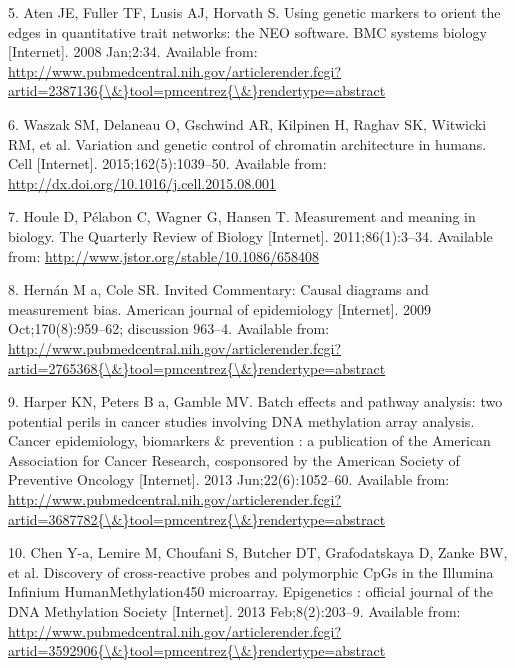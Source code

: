 \documentclass[]{article}
\begin{document}
\hypertarget{ref-Aten2008}{}
5. Aten JE, Fuller TF, Lusis AJ, Horvath S. Using genetic markers to
orient the edges in quantitative trait networks: the NEO software. BMC
systems biology {[}Internet{]}. 2008 Jan;2:34. Available from:
\href{http://www.pubmedcentral.nih.gov/articlerender.fcgi?artid=2387136\%7B/\&\%7Dtool=pmcentrez\%7B/\&\%7Drendertype=abstract}{http://www.pubmedcentral.nih.gov/articlerender.fcgi?artid=2387136\{\textbackslash{}\&\}tool=pmcentrez\{\textbackslash{}\&\}rendertype=abstract}

\hypertarget{ref-Waszak2015}{}
6. Waszak SM, Delaneau O, Gschwind AR, Kilpinen H, Raghav SK, Witwicki
RM, et al. Variation and genetic control of chromatin architecture in
humans. Cell {[}Internet{]}. 2015;162(5):1039--50. Available from:
\url{http://dx.doi.org/10.1016/j.cell.2015.08.001}

\hypertarget{ref-Houle2011}{}
7. Houle D, Pélabon C, Wagner G, Hansen T. Measurement and meaning in
biology. The Quarterly Review of Biology {[}Internet{]}.
2011;86(1):3--34. Available from:
\url{http://www.jstor.org/stable/10.1086/658408}

\hypertarget{ref-Hernan2009}{}
8. Hernán M a, Cole SR. Invited Commentary: Causal diagrams and
measurement bias. American journal of epidemiology {[}Internet{]}. 2009
Oct;170(8):959--62; discussion 963--4. Available from:
\href{http://www.pubmedcentral.nih.gov/articlerender.fcgi?artid=2765368\%7B/\&\%7Dtool=pmcentrez\%7B/\&\%7Drendertype=abstract}{http://www.pubmedcentral.nih.gov/articlerender.fcgi?artid=2765368\{\textbackslash{}\&\}tool=pmcentrez\{\textbackslash{}\&\}rendertype=abstract}

\hypertarget{ref-Harper2013}{}
9. Harper KN, Peters B a, Gamble MV. Batch effects and pathway analysis:
two potential perils in cancer studies involving DNA methylation array
analysis. Cancer epidemiology, biomarkers \& prevention : a publication
of the American Association for Cancer Research, cosponsored by the
American Society of Preventive Oncology {[}Internet{]}. 2013
Jun;22(6):1052--60. Available from:
\href{http://www.pubmedcentral.nih.gov/articlerender.fcgi?artid=3687782\%7B/\&\%7Dtool=pmcentrez\%7B/\&\%7Drendertype=abstract}{http://www.pubmedcentral.nih.gov/articlerender.fcgi?artid=3687782\{\textbackslash{}\&\}tool=pmcentrez\{\textbackslash{}\&\}rendertype=abstract}

\hypertarget{ref-Chen2013a}{}
10. Chen Y-a, Lemire M, Choufani S, Butcher DT, Grafodatskaya D, Zanke
BW, et al. Discovery of cross-reactive probes and polymorphic CpGs in
the Illumina Infinium HumanMethylation450 microarray. Epigenetics :
official journal of the DNA Methylation Society {[}Internet{]}. 2013
Feb;8(2):203--9. Available from:
\href{http://www.pubmedcentral.nih.gov/articlerender.fcgi?artid=3592906\%7B/\&\%7Dtool=pmcentrez\%7B/\&\%7Drendertype=abstract}{http://www.pubmedcentral.nih.gov/articlerender.fcgi?artid=3592906\{\textbackslash{}\&\}tool=pmcentrez\{\textbackslash{}\&\}rendertype=abstract}
\end{document}
